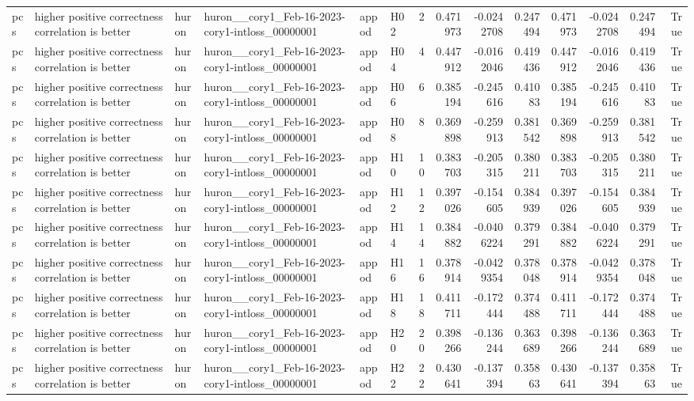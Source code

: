 \begin{longtable}{llllllrrrrrrrr}
pcs & higher positive correctness correlation is better & huron & huron\_\_cory1\_Feb-16-2023-cory1-intloss\_00000001 & appod & H02 & 2 & 0.471973 & -0.0242708 & 0.247494 & 0.471973 & -0.0242708 & 0.247494 & True \\
pcs & higher positive correctness correlation is better & huron & huron\_\_cory1\_Feb-16-2023-cory1-intloss\_00000001 & appod & H04 & 4 & 0.447912 & -0.0162046 & 0.419436 & 0.447912 & -0.0162046 & 0.419436 & True \\
pcs & higher positive correctness correlation is better & huron & huron\_\_cory1\_Feb-16-2023-cory1-intloss\_00000001 & appod & H06 & 6 & 0.385194 & -0.245616 & 0.41083 & 0.385194 & -0.245616 & 0.41083 & True \\
pcs & higher positive correctness correlation is better & huron & huron\_\_cory1\_Feb-16-2023-cory1-intloss\_00000001 & appod & H08 & 8 & 0.369898 & -0.259913 & 0.381542 & 0.369898 & -0.259913 & 0.381542 & True \\
pcs & higher positive correctness correlation is better & huron & huron\_\_cory1\_Feb-16-2023-cory1-intloss\_00000001 & appod & H10 & 10 & 0.383703 & -0.205315 & 0.380211 & 0.383703 & -0.205315 & 0.380211 & True \\
pcs & higher positive correctness correlation is better & huron & huron\_\_cory1\_Feb-16-2023-cory1-intloss\_00000001 & appod & H12 & 12 & 0.397026 & -0.154605 & 0.384939 & 0.397026 & -0.154605 & 0.384939 & True \\
pcs & higher positive correctness correlation is better & huron & huron\_\_cory1\_Feb-16-2023-cory1-intloss\_00000001 & appod & H14 & 14 & 0.384882 & -0.0406224 & 0.379291 & 0.384882 & -0.0406224 & 0.379291 & True \\
pcs & higher positive correctness correlation is better & huron & huron\_\_cory1\_Feb-16-2023-cory1-intloss\_00000001 & appod & H16 & 16 & 0.378914 & -0.0429354 & 0.378048 & 0.378914 & -0.0429354 & 0.378048 & True \\
pcs & higher positive correctness correlation is better & huron & huron\_\_cory1\_Feb-16-2023-cory1-intloss\_00000001 & appod & H18 & 18 & 0.411711 & -0.172444 & 0.374488 & 0.411711 & -0.172444 & 0.374488 & True \\
pcs & higher positive correctness correlation is better & huron & huron\_\_cory1\_Feb-16-2023-cory1-intloss\_00000001 & appod & H20 & 20 & 0.398266 & -0.136244 & 0.363689 & 0.398266 & -0.136244 & 0.363689 & True \\
pcs & higher positive correctness correlation is better & huron & huron\_\_cory1\_Feb-16-2023-cory1-intloss\_00000001 & appod & H22 & 22 & 0.430641 & -0.137394 & 0.35863 & 0.430641 & -0.137394 & 0.35863 & True \\

\end{longtable}
